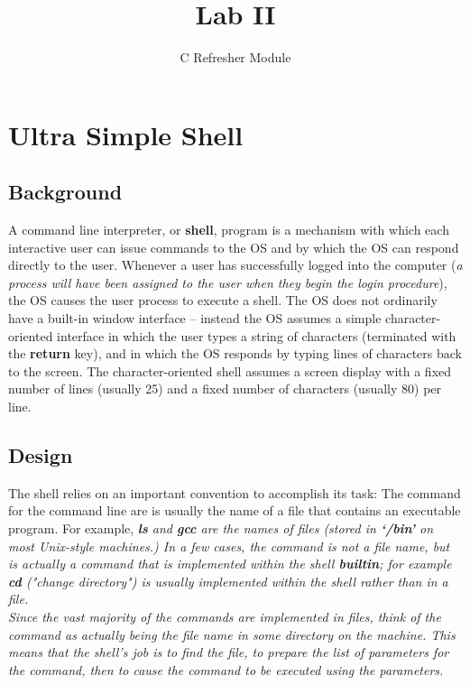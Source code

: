 \documentclass{article}
\title{\vspace{-7cm}}
\begin{document}
\title{Lab II}
\author{C Refresher Module}

\maketitle

\section{Ultra Simple Shell}
\renewcommand{\thefootnote}{\fnsymbol{footnote}}
\subsection{Background}
A command line interpreter, or \textbf{shell}, program is a mechanism with which each interactive user can issue commands to the OS and by which the OS can respond directly to the user.  Whenever a user has successfully logged into the computer (\textit{a process will have been assigned to the user when they begin the login procedure}), the OS causes the user process to execute a shell.  The OS does not ordinarily have a built-in window interface -- instead the OS assumes a simple character-oriented interface in which the user types a string of characters (terminated with the \textbf{return} key), and in which the OS responds by typing lines of characters back to the screen.  The character-oriented shell assumes a screen display with a fixed number of lines (usually 25) and a fixed number of characters (usually 80) per line.
\subsection{Design}
The shell relies on an important convention to accomplish its task: The command for the command line are is usually the name of a file that contains an executable program.  For example, \em{\textbf{ls}} \em and \em{\textbf{gcc}} \em are the names of files (stored in \textbf{\textit{`/bin'}} on most Unix-style machines.)  In a few cases, the command is not a file name, but is actually a command that is implemented within the shell \textbf{builtin}; for example \textbf{cd} ("change directory") is usually implemented within the shell rather than in a file.  \\
\em{Since the vast majority of the commands are implemented in files, think of the command as actually being the file name in some directory on the machine.  This means that the shell's job is to find the file, to prepare the list of parameters for the command, then to cause the command to be executed using the parameters.} \em
\\
\end{document}
